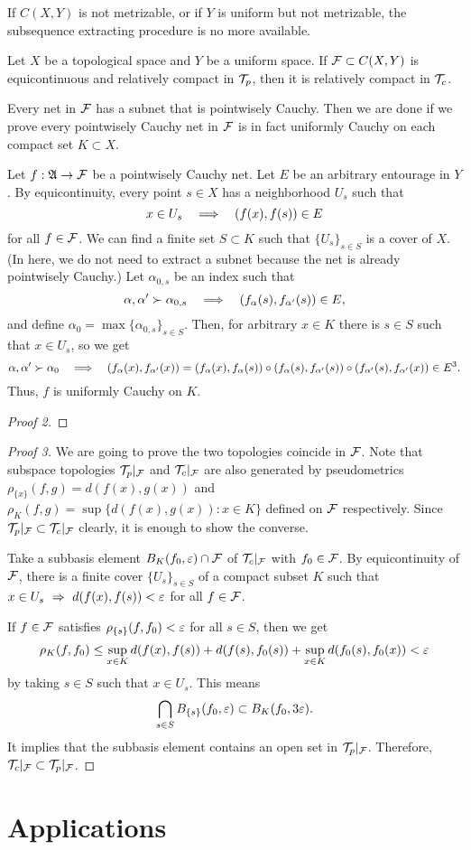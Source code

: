\documentclass{../exp}
\begin{document}
If $C(X,Y)$ is not metrizable, or if $Y$ is uniform but not metrizable, the subsequence extracting procedure is no more available.

\begin{thm}
Let $X$ be a topological space and $Y$ be a uniform space.
If $\mathcal{F}\subset C(X,Y)$ is equicontinuous and relatively compact in $\mathcal{T}_p$, then it is relatively compact in $\mathcal{T}_c$.
\end{thm}
\begin{pf}[1]
Every net in $\mathcal{F}$ has a subnet that is pointwisely Cauchy.
Then we are done if we prove every pointwisely Cauchy net in $\mathcal{F}$ is in fact uniformly Cauchy on each compact set $K\subset X$.

Let $f:\fA\to\cF$ be a pointwisely Cauchy net.
Let $E$ be an arbitrary entourage in $Y$.
By equicontinuity, every point $s\in X$ has a neighborhood $U_s$ such that
\[x\in U_s\impl(f(x),f(s))\in E\]
for all $f\in\mathcal{F}$.
We can find a finite set $S\subset K$ such that $\{U_s\}_{s\in S}$ is a cover of $X$.
(In here, we do not need to extract a subnet because the net is already pointwisely Cauchy.)
Let $\alpha_{0,s}$ be an index such that
\[\alpha,\alpha'\succ\alpha_{0,s}\impl(f_\alpha(s),f_{\alpha'}(s))\in E,\]
and define $\alpha_0=\max\{\alpha_{0,s}\}_{s\in S}$.
Then, for arbitrary $x\in K$ there is $s\in S$ such that $x\in U_s$, so we get
\[\alpha,\alpha'\succ\alpha_0\impl(f_\alpha(x),f_{\alpha'}(x))=(f_\alpha(x),f_\alpha(s))\o(f_\alpha(s),f_{\alpha'}(s))\o(f_{\alpha'}(s),f_{\alpha'}(x))\in E^3.\]
Thus, $f$ is uniformly Cauchy on $K$.
\end{pf}

\begin{proof}[Proof 2]

\end{proof}

\begin{proof}[Proof 3]
We are going to prove the two topologies coincide in $\mathcal{F}$.
Note that subspace topologies $\mathcal{T}_p\vert_{\mathcal{F}}$ and $\mathcal{T}_c\vert_{\mathcal{F}}$ are also generated by pseudometrics $\rho_{\{x\}}(f,g)=d(f(x),g(x))$ and $\rho_K(f,g)=\sup\{d(f(x),g(x)):x\in K\}$ defined on $\mathcal{F}$ respectively.
Since $\mathcal{T}_p\vert_{\mathcal{F}}\subset\mathcal{T}_c\vert_{\mathcal{F}}$ clearly, it is enough to show the converse.

Take a subbasis element $B_K(f_0,\varepsilon)\cap\mathcal{F}$ of $\mathcal{T}_c\vert_{\mathcal{F}}$ with $f_0\in\mathcal{F}$.
By equicontinuity of $\mathcal{F}$, there is a finite cover $\{U_s\}_{s\in S}$ of a compact subset $K$ such that $x\in U_s\,\impl\,d(f(x),f(s))<\e$ for all $f\in\mathcal{F}$.

If $f\in\mathcal{F}$ satisfies $\rho_{\{s\}}(f,f_0)<\varepsilon$ for all $s\in S$, then we get
\[\rho_K(f,f_0)\le\sup_{x\in K}d(f(x),f(s))+d(f(s),f_0(s))+\sup_{x\in K}d(f_0(s),f_0(x))<\varepsilon\]
by taking $s\in S$ such that $x\in U_s$.
This means
\[\bigcap_{s\in S}B_{\{s\}}(f_0,\varepsilon)\subset B_K(f_0,3\varepsilon).\]
It implies that the subbasis element contains an open set in $\mathcal{T}_p\vert_{\mathcal{F}}$.
Therefore, $\mathcal{T}_c\vert_{\mathcal{F}}\subset\mathcal{T}_p\vert_{\mathcal{F}}$.
\end{proof}


\section{Applications}
\end{document}
